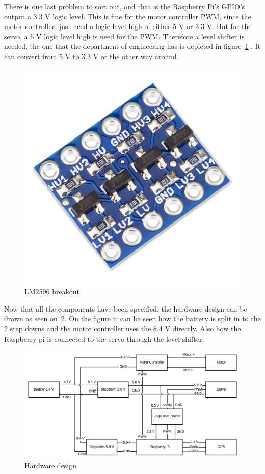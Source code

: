 There is one last problem to sort out, and that is the Raspberry Pi's GPIO's output a 3.3 V logic level. This is fine for the motor controller PWM, since the motor controller, just need a logic level high of either 5 V or 3.3 V. But for the servo, a 5 V logic level high is need for the PWM. Therefore a level shifter is needed, the one that the department of engineering has is depicted in figure~\ref{fig:levelshifter} \cite{levelshifter}. It can convert from 5 V to 3.3 V or the other way around. 

\begin{figure}[H]
\centering
\includegraphics[width=0.3\linewidth]{Images/Design/levelshifter}
\caption{LM2596 breakout}
\label{fig:levelshifter}
\end{figure}

Now that all the components have been specified, the hardware design can be drawn as seen on~\ref{fig:hardware_design}. On the figure it can be seen how the battery is split in to the 2 step downs and the motor controller uses the 8.4 V directly. Also how the Raspberry pi is connected to the servo through the level shifter.

\begin{figure}[H]
\centering
\includegraphics[width=1\linewidth]{Images/Design/Hardware_design}
\caption{Hardware design}
\label{fig:hardware_design}
\end{figure}


% 
